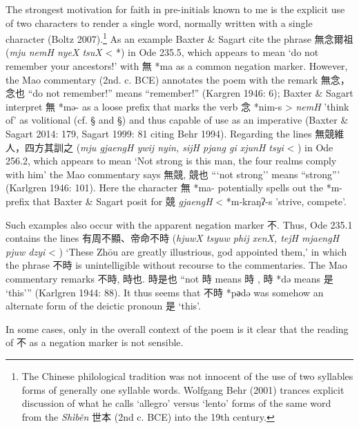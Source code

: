 The strongest motivation for faith in pre-initials known to me is the
explicit use of two characters to render a single word, normally written
with a single character (Boltz 2007).\footnote{The Chinese philological
  tradition was not innocent of the use of two syllables forms of
  generally one syllable words. Wolfgang Behr (2001) trances explicit
  discussion of what he calls `allegro' versus `lento' forms of the same
  word from the \emph{Shìběn} 世本 (2nd c. BCE) into the 19th century.}
As an example Baxter \& Sagart cite the phrase 無念爾祖 (\emph{mju nemH
nyeX tsuX} \textless{} *{}) in Ode 235.5, which
appears to mean `do not remember your ancestors!' with 無 *ma as a
common negation marker. However, the Mao commentary (2nd. c. BCE)
annotates the poem with the remark 無念，念也 ``do not remember!'' means
``remember!'' (Kargren 1946: 6); Baxter \& Sagart interpret 無 *mə- as a
loose prefix that marks the verb 念 *n{}im-s \textgreater{} \emph{nemH}
'think of' as volitional (cf. § and §) and thus capable of use as an
imperative (Baxter \& Sagart 2014: 179, Sagart 1999: 81 citing Behr
1994). Regarding the lines 無競維人，四方其訓之 (\emph{mju gjaengH ywij
nyin, sijH pjang gi xjunH tsyi} \textless{} 
{}) in Ode 256.2, which appears to mean `Not
strong is this man, the four realms comply with him' the Mao commentary
says 無競, 競也 ```not strong'' means ``strong''' (Karlgren 1946: 101).
Here the character 無 *ma- potentially spells out the *m- prefix that
Baxter \& Sagart posit for 競 \emph{gjaengH} \textless{} *m‑kraŋʔ-s
'strive, compete'.

Such examples also occur with the apparent negation marker 不. Thus, Ode
235.1 contains the lines 有周不顯、帝命不時 (\emph{hjuwX tsyuw phij
xenX, tejH mjaengH pjuw dzyi} \textless{} {}) `These Zhōu are greatly illustrious, god appointed them,'
in which the phrase 不時 {} is unintelligible without recourse to
the commentaries. The Mao commentary remarks 不時, 時也. 時是也 ``not 時
{} means 時 {}, 時 *də means 是 {} `this''' (Karlgren 1944: 88). It
thus seems that 不時 *pәdə was somehow an alternate form of the deictic
pronoun 是 {} `this'.

In some cases, only in the overall context of the poem is it clear that
the reading of 不 as a negation marker is not sensible.

